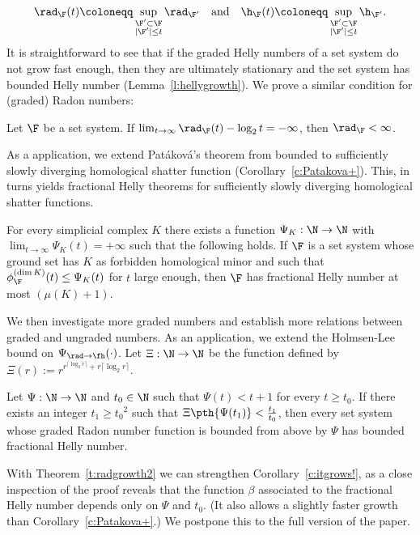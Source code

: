 %
\begin{equation}
  \rad_\F(t) \coloneqq \sup \limits_{\substack{\F'\subset \F \\ |\F'|\leq t}} \rad_{\F'}
 \quad \text{and} \quad
 \h_\F(t) \coloneqq \sup\limits_{\substack{\F'\subset \F \\ |\F'|\leq t}} \h_{\F'}.
\end{equation}
%
\noindent
It is straightforward to see that if the graded Helly numbers of a set system do not grow fast enough, then they are ultimately stationary and the set system has bounded Helly number (Lemma~\ref{l:hellygrowth}). We prove a similar condition for (graded) Radon numbers:
%
\begin{theorem}\label{t:radgrowth}
  Let $\F$ be a set system. If $\lim_{t \to \infty} \rad_\F(t) - \log_2 t = -\infty$, then $\rad_\F < \infty$.
\end{theorem}
%
\noindent
As a application, we extend Patáková's theorem from bounded to sufficiently slowly diverging homological shatter function (Corollary~\ref{c:Patakova+}). This, in turns yields fractional Helly theorems for sufficiently slowly diverging homological shatter functions.
%
\begin{corollary}\label{c:itgrows!}
  For every simplicial complex $K$ there exists a function $\Psi_K : \N \to \N$ with $\lim_{t \to \infty} \Psi_K(t) = +\infty$ such that the following holds. If $\F$ is a set system whose ground set has $K$ as forbidden homological minor and such that $\phi_{\F}^{(\dim K)}(t) \le \Psi_K(t)$ for $t$ large enough, then $\F$ has fractional Helly number at most $(\mu(K)+1)$.
\end{corollary}
%
\medskip
%
We then investigate more graded numbers and establish more relations between graded and ungraded numbers. As an application, we extend the Holmsen-Lee bound on $\Psi_{\rad \to \fh}(\cdot)$. Let $\Xi: \N \to \N$ be the function defined by $\Xi(r) := r^{r^{\lceil \log_2r \rceil}+r\lceil \log_2r \rceil}$. 
%
\begin{theorem}\label{t:radgrowth2}
  Let $\Psi: \N\rightarrow \N$ and $t_0 \in \N$ such that $\Psi(t) < t+1$ for every $t \ge t_0$. If there exists an integer $t_1 \ge {t_0}^2$ such that $\Xi\pth{\Psi(t_1)} < \frac{t_1}{t_0}$, then every set system whose graded Radon number function is bounded from above by $\Psi$ has bounded fractional Helly number.
\end{theorem}
%
\noindent
With Theorem~\ref{t:radgrowth2} we can strengthen Corollary~\ref{c:itgrows!}, as a close inspection of the proof reveals that the function $\beta$ associated to the fractional Helly number depends only on $\Psi$ and $t_0$. (It also allows a slightly faster growth than Corollary~\ref{c:Patakova+}.) We postpone this to the full version of the paper.
%
%
